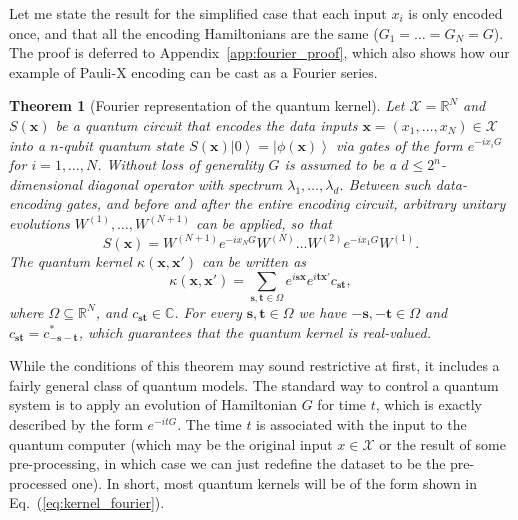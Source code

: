 \documentclass[aps, reprint, onecolumn, nofootinbib, longbibliography]{revtex4-2}
\newtheorem{theorem}{Theorem}[]
\newcommand{\ket}[1]{\ensuremath{\left| #1 \right \rangle}}
\begin{document}
Let me state the result for the simplified case that each input $x_i$ is only encoded once, and that all the encoding Hamiltonians are the same ($G_1 = \dots = G_N = G$). The proof is deferred to Appendix~\ref{app:fourier_proof}, which also shows how our example of Pauli-X encoding can be cast as a Fourier series.

\begin{theorem}[Fourier representation of the quantum kernel]\label{thm:kernel_fourier}
Let $\mathcal{X} = \mathbb{R}^N$ and $S(\mathbf{x})$ be a quantum circuit that encodes the data inputs $\mathbf{x} = (x_1, \dots, x_N) \in \mathcal{X}$ into a $n$-qubit quantum state $S(\mathbf{x}) \ket{0} = \ket{\phi(\mathbf{x})}$ via gates of the form $e^{-i x_i G }$ for $i = 1,\dots, N$. Without loss of generality $G$ is assumed to be a $d \leq 2^n$-dimensional diagonal operator with spectrum $\lambda_1, \dots, \lambda_d$. Between such data-encoding gates, and before and after the entire encoding circuit, arbitrary unitary evolutions $W^{(1)}, \dots, W^{(N+1)}$ can be applied, so that 
\begin{equation}
    S(\mathbf{x}) = W^{(N+1)} e^{-i x_N G} W^{(N)} \dots W^{(2)} e^{-i x_1 G} W^{(1)}.
\end{equation}
The quantum kernel $\kappa(\mathbf{x}, \mathbf{x}')$ can  be written as
\begin{equation}\label{eq:kernel_fourier}
    \kappa(\mathbf{x}, \mathbf{x}') = \sum_{\mathbf{s}, \mathbf{t} \in \Omega} e^{i \mathbf{s} \mathbf{x}} e^{i \mathbf{t} \mathbf{x}'} c_{\mathbf{st}},  
\end{equation}
where $\Omega \subseteq \mathbb{R}^N$, and $c_{\mathbf{st}} \in \mathbb{C}$.
For every $\mathbf{s},\mathbf{t} \in \Omega$ we have $-\mathbf{s},-\mathbf{t} \in \Omega$ and $c_{\mathbf{st}} = c^*_{-\mathbf{s} -\mathbf{t}}$, which guarantees that the quantum kernel is real-valued. 
\end{theorem}

While the conditions of this theorem may sound restrictive at first, it includes a fairly general class of quantum models. The standard way to control a quantum system is to apply an evolution of Hamiltonian $G$ for time $t$, which is exactly described by the form $e^{-i t G}$. The time $t$ is associated with the input to the quantum computer (which may be the original input $x \in \mathcal{X}$ or the result of some pre-processing, in which case we can just redefine the dataset to be the pre-processed one). In short, most quantum kernels will be of the form shown in Eq.~(\ref{eq:kernel_fourier}). 
\end{document}
